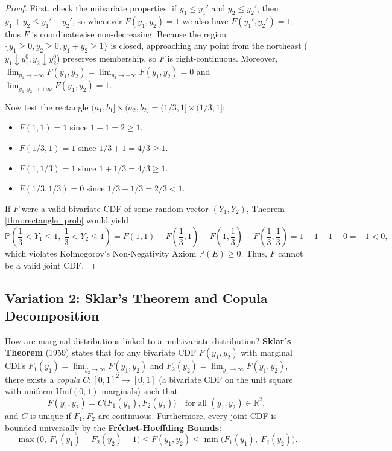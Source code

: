 \documentclass[11pt, letterpaper]{article}
\theoremstyle{definition}
\theoremstyle{remark}
\newcommand{\R}{\mathbb{R}}
\newcommand{\Prob}{\mathbb{P}}
\begin{document}
\begin{proof}
First, check the univariate properties: if $y_1 \le y_1'$ and $y_2 \le y_2'$, then $y_1 + y_2 \le y_1' + y_2'$, so whenever $F(y_1, y_2) = 1$ we also have $F(y_1', y_2') = 1$; thus $F$ is coordinatewise non-decreasing. Because the region $\{y_1 \ge 0, y_2 \ge 0, y_1 + y_2 \ge 1\}$ is closed, approaching any point from the northeast ($y_1 \downarrow y_1^0, y_2 \downarrow y_2^0$) preserves membership, so $F$ is right-continuous. Moreover, $\lim_{y_1 \to -\infty} F(y_1, y_2) = \lim_{y_2 \to -\infty} F(y_1, y_2) = 0$ and $\lim_{y_1, y_2 \to +\infty} F(y_1, y_2) = 1$.

Now test the rectangle $(a_1, b_1] \times (a_2, b_2] = (1/3, 1] \times (1/3, 1]$:
\begin{itemize}
    \item $F(1, 1) = 1$ since $1 + 1 = 2 \ge 1$.
    \item $F(1/3, 1) = 1$ since $1/3 + 1 = 4/3 \ge 1$.
    \item $F(1, 1/3) = 1$ since $1 + 1/3 = 4/3 \ge 1$.
    \item $F(1/3, 1/3) = 0$ since $1/3 + 1/3 = 2/3 < 1$.
\end{itemize}
If $F$ were a valid bivariate CDF of some random vector $(Y_1, Y_2)$, Theorem \ref{thm:rectangle_prob} would yield
\[
\Prob\left(\frac{1}{3} < Y_1 \le 1,\ \frac{1}{3} < Y_2 \le 1\right) = F(1, 1) - F\left(\frac{1}{3}, 1\right) - F\left(1, \frac{1}{3}\right) + F\left(\frac{1}{3}, \frac{1}{3}\right) = 1 - 1 - 1 + 0 = -1 < 0,
\]
which violates Kolmogorov's Non-Negativity Axiom $\Prob(E) \ge 0$. Thus, $F$ cannot be a valid joint CDF.
\end{proof}

\subsection{Variation 2: Sklar's Theorem and Copula Decomposition}

How are marginal distributions linked to a multivariate distribution? \textbf{Sklar's Theorem} (1959) states that for any bivariate CDF $F(y_1, y_2)$ with marginal CDFs $F_1(y_1) = \lim_{y_2 \to \infty} F(y_1, y_2)$ and $F_2(y_2) = \lim_{y_1 \to \infty} F(y_1, y_2)$, there exists a \emph{copula} $C : [0, 1]^2 \to [0, 1]$ (a bivariate CDF on the unit square with uniform $\text{Unif}(0,1)$ marginals) such that
\[
F(y_1, y_2) = C\bigl(F_1(y_1), F_2(y_2)\bigr) \quad \text{for all } (y_1, y_2) \in \R^2,
\]
and $C$ is unique if $F_1, F_2$ are continuous. Furthermore, every joint CDF is bounded universally by the \textbf{Fr\'{e}chet-Hoeffding Bounds}:
\[
\max\bigl(0,\ F_1(y_1) + F_2(y_2) - 1\bigr) \le F(y_1, y_2) \le \min\bigl(F_1(y_1),\ F_2(y_2)\bigr).
\]
\end{document}
